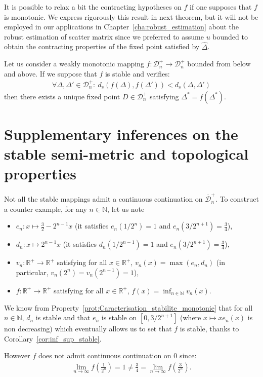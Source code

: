 \documentclass[a4papaer, titlepage]{book}
\begin{document}
It is possible to relax a bit the contracting hypotheses on $f$ if one supposes that $f$ is monotonic. We express rigorously this result in next theorem, but it will not be employed in our applications in Chapter~\ref{cha:robust_estimation} about the robust estimation of scatter matrix since we preferred to assume $u$ bounded to obtain the contracting properties of the fixed point satisfied by $\hat \Delta$.
\begin{theorem}\label{the:point_fixe_fonction_stable_monotone_de_D_n}
   Let us consider a weakly monotonic mapping $f: \mathcal D_n^+\to \mathcal D_n^+$ bounded from below and above. If we suppose that $f$ is stable and verifies:
  \begin{align}\label{eq:faiblement_contractant}
    \forall \Delta,\Delta' \in\mathcal D_n^+: \ d_s(f(\Delta),f(\Delta') )<d_s(\Delta,\Delta')
   \end{align} then there exists a unique fixed point $D\in\mathcal D_n^+$ satisfying $\Delta^* = f(\Delta^*)$.
\end{theorem}


\section{Supplementary inferences on the stable semi-metric and topological properties}\label{sub:stable_metic}
\begin{remark}\label{rem:stable_non_continu_en_zero}
  Not all the stable mappings admit a continuous continuation on $\overline{\mathcal D}_n^+$. To construct a counter example, for any $n \in \mathbb N$, let us note 
  \begin{itemize}
    \item $e_n: x \mapsto \frac{3}{2} - 2^{n-1}x$ (it satisfies $e_n(1/2^n) = 1$ and $e_n(3/2^{n+1}) = \frac{3}{4}$),
    \item $d_n: x \mapsto 2^{n-1}x$ (it satisfies $d_n(1/2^{n-1}) = 1$ and $e_n(3/2^{n+1}) = \frac{3}{4}$),
    \item $v_n : \mathbb R^+ \to \mathbb R^+$ satisfying for all $x \in \mathbb R^+$, $v_n(x) = \max(e_n,d_n)$ (in particular, $v_n(2^n) = v_n(2^{n-1}) = 1$),
    \item $f : \mathbb R^+ \to \mathbb R^+$ satisfying for all $x \in \mathbb R^+$, $f(x) = \inf_{n\in \mathbb N} v_n(x)$.
  \end{itemize} 
  We know from Property~\ref{prot:Caracterisation_stabilite_monotonie} that for all $n \in \mathbb N$, $d_n$ is stable and that $e_n$ is stable on $[0,3/2^{n+1}]$ (where $x \mapsto xe_n(x)$ is non decreasing) which eventually allows us to set that $f$ is stable, thanks to Corollary~\ref{cor:inf_sup_stable}.

  However $f$ does not admit continuous continuation on $0$ since:
  \begin{align*}
    \underset{n \to \infty} \lim f \left( \frac{1}{2^n} \right) = 1 \neq \frac{3}{4}= \underset{n \to \infty} \lim f \left( \frac{3}{2^n}\right).
  \end{align*}
\end{remark}
\end{document}
